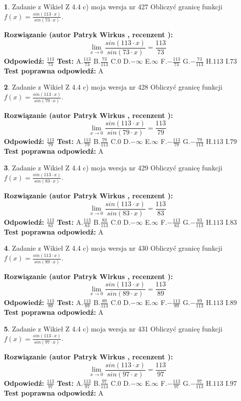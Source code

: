 \documentclass[12pt, a4paper]{article}
\theoremstyle{definition} %
\newtheorem{zad}{}
\newcommand{\zadStart}[1]{\begin{zad}#1\newline}
\newcommand{\zadStop}{\end{zad}}
\newcommand{\rozwStart}[2]{\noindent \textbf{Rozwiązanie (autor #1 , recenzent #2): }\newline}
\newcommand{\rozwStop}{\newline}
\newcommand{\odpStart}{\noindent \textbf{Odpowiedź:}\newline}
\newcommand{\odpStop}{\newline}
\newcommand{\testStart}{\noindent \textbf{Test:}\newline}
\newcommand{\testStop}{\newline}
\newcommand{\kluczStart}{\noindent \textbf{Test poprawna odpowiedź:}\newline}
\newcommand{\kluczStop}{\newline}
\begin{document}
\zadStart{Zadanie z Wikieł Z 4.4 c) moja wersja nr 427}
Obliczyć granicę funkcji $f(x)=\frac{sin(113\cdot x)}{sin(73\cdot x)}$.
\zadStop
\rozwStart{Patryk Wirkus}{}
$$\lim\limits_{x\to 0}\frac{sin(113\cdot x)}{sin(73\cdot x)}=
\frac{113}{73}$$
\rozwStop
\odpStart
$\frac{113}{73}$
\odpStop
\testStart
A.$\frac{113}{73}$
B.$\frac{73}{113}$
C.$0$
D.$-\infty$
E.$\infty$
F.$-\frac{113}{73}$
G.$-\frac{73}{113}$
H.$113$
I.$73$
\testStop
\kluczStart
A
\kluczStop



\zadStart{Zadanie z Wikieł Z 4.4 c) moja wersja nr 428}
Obliczyć granicę funkcji $f(x)=\frac{sin(113\cdot x)}{sin(79\cdot x)}$.
\zadStop
\rozwStart{Patryk Wirkus}{}
$$\lim\limits_{x\to 0}\frac{sin(113\cdot x)}{sin(79\cdot x)}=
\frac{113}{79}$$
\rozwStop
\odpStart
$\frac{113}{79}$
\odpStop
\testStart
A.$\frac{113}{79}$
B.$\frac{79}{113}$
C.$0$
D.$-\infty$
E.$\infty$
F.$-\frac{113}{79}$
G.$-\frac{79}{113}$
H.$113$
I.$79$
\testStop
\kluczStart
A
\kluczStop



\zadStart{Zadanie z Wikieł Z 4.4 c) moja wersja nr 429}
Obliczyć granicę funkcji $f(x)=\frac{sin(113\cdot x)}{sin(83\cdot x)}$.
\zadStop
\rozwStart{Patryk Wirkus}{}
$$\lim\limits_{x\to 0}\frac{sin(113\cdot x)}{sin(83\cdot x)}=
\frac{113}{83}$$
\rozwStop
\odpStart
$\frac{113}{83}$
\odpStop
\testStart
A.$\frac{113}{83}$
B.$\frac{83}{113}$
C.$0$
D.$-\infty$
E.$\infty$
F.$-\frac{113}{83}$
G.$-\frac{83}{113}$
H.$113$
I.$83$
\testStop
\kluczStart
A
\kluczStop



\zadStart{Zadanie z Wikieł Z 4.4 c) moja wersja nr 430}
Obliczyć granicę funkcji $f(x)=\frac{sin(113\cdot x)}{sin(89\cdot x)}$.
\zadStop
\rozwStart{Patryk Wirkus}{}
$$\lim\limits_{x\to 0}\frac{sin(113\cdot x)}{sin(89\cdot x)}=
\frac{113}{89}$$
\rozwStop
\odpStart
$\frac{113}{89}$
\odpStop
\testStart
A.$\frac{113}{89}$
B.$\frac{89}{113}$
C.$0$
D.$-\infty$
E.$\infty$
F.$-\frac{113}{89}$
G.$-\frac{89}{113}$
H.$113$
I.$89$
\testStop
\kluczStart
A
\kluczStop



\zadStart{Zadanie z Wikieł Z 4.4 c) moja wersja nr 431}
Obliczyć granicę funkcji $f(x)=\frac{sin(113\cdot x)}{sin(97\cdot x)}$.
\zadStop
\rozwStart{Patryk Wirkus}{}
$$\lim\limits_{x\to 0}\frac{sin(113\cdot x)}{sin(97\cdot x)}=
\frac{113}{97}$$
\rozwStop
\odpStart
$\frac{113}{97}$
\odpStop
\testStart
A.$\frac{113}{97}$
B.$\frac{97}{113}$
C.$0$
D.$-\infty$
E.$\infty$
F.$-\frac{113}{97}$
G.$-\frac{97}{113}$
H.$113$
I.$97$
\testStop
\kluczStart
A
\kluczStop
\end{document}
